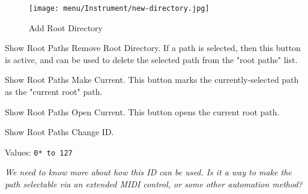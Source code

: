 \begin{figure}[H]
   \centering 
   \texttt{[image: menu/Instrument/new-directory.jpg]}
   \caption{Add Root Directory}
   \label{fig:add_root_directory}
\end{figure}

   Show Root Paths Remove Root Directory.
   If a path is selected, then this button is active, and can be used to
   delete the selected path from the "root paths" list.

   Show Root Paths Make Current.
   This button marks the currently-selected path as the "current root" path.

   Show Root Paths Open Current.
   This button opens the current root path.

   Show Root Paths Change ID.

   Values: \texttt{0* to 127}

   \textsl{
   We need to know more about how this ID can be used.
   Is it a way to make the path selectable via an extended MIDI control, or
   some other automation method?
   }

